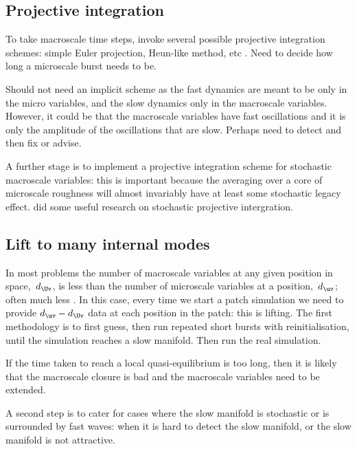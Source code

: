 \subsection{Projective integration}

To take macroscale time steps, invoke several possible projective integration schemes: simple Euler projection, Heun-like method, etc
\citep{Samaey08}.
Need to decide how long a microscale burst needs to be.

Should not need an implicit scheme as the fast dynamics are meant to be only in the micro variables, and the slow dynamics only in the macroscale variables.
However, it could be that the macroscale variables have fast oscillations and it is only the amplitude of the oscillations that are slow.  
Perhaps need to detect and then fix or advise.

A further stage is to implement a projective integration scheme for stochastic macroscale variables: this is important because the averaging over a core of microscale roughness will almost invariably have at least some stochastic legacy effect.
\cite{Calderon2007} did some useful research on stochastic projective intergration.




\subsection{Lift to many internal modes}

In most problems the number of macroscale variables at any given position in space,~\(d_{\Uv}\), is less than the number of microscale variables at a position,~\(d_{\uv}\); often much less \citep[e.g.]{Kevrekidis09a}.
In this case, every time we start a patch simulation we need to provide  \(d_{\uv}-d_{\Uv}\) data at each position in the patch: this is lifting.
The first methodology is to first guess, then run repeated short bursts with reinitialisation, until the simulation reaches a slow manifold.
Then run the real simulation.

If the time taken to reach a local quasi-equilibrium is too long, then it is likely that the macroscale closure is bad and the macroscale variables need to be extended.

A second step is to cater for cases where the slow manifold is stochastic or is surrounded by fast waves: when it is hard to detect the slow manifold, or the slow manifold is not attractive.





